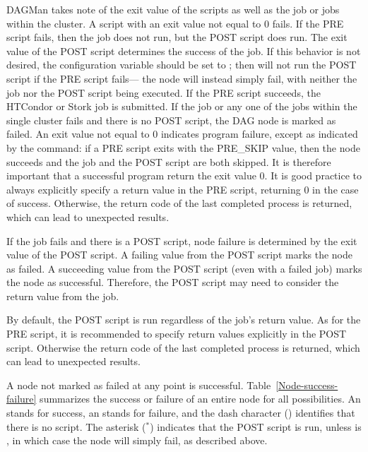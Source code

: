 \begin{itemize}
DAGMan takes note of the exit value of the scripts as well as the job or jobs
within the cluster.  
A script with an exit value not equal to 0 fails.  
If the PRE script fails, 
then the job does not run, but the POST script does run.
The exit value of the POST script determines the success of the job. 
If this behavior is not desired, 
the configuration variable  
should be set to ;
then  will not run the POST script if the PRE script fails---%
the node will instead simply fail, 
with neither the job nor the POST script being executed.
If the PRE script succeeds, the HTCondor or Stork job is submitted.
If the job or any one of the jobs within the single cluster fails and there is
no POST script, 
the DAG node is marked as failed.  
An exit value not equal to 0 indicates program failure,
except as indicated by the  command:
if a PRE script exits with the PRE\_SKIP value, 
then the node succeeds and the job and the POST script are both skipped.  
It is therefore important that a
successful program return the exit value 0. 
It is good practice to always
explicitly specify a return value in the PRE script,
returning 0 in the case of success.
Otherwise,
the return code of the last completed process is returned,
which can lead to unexpected results. 

If the job fails and there is a POST script,
node failure is determined by the exit value of the POST script.
A failing value from the POST script marks the node as failed.
A succeeding value from the POST script (even with a failed
job) marks the node as successful.
Therefore, the POST script may need to consider the return
value from the job.

By default, the POST script is run regardless of the job's
return value. As for the PRE script, it is recommended to 
specify return values explicitly in the POST script. 
Otherwise the return code of the last completed process 
is returned, which can lead to unexpected results. 

A node not marked as failed at any point is successful.
Table~\ref{Node-success-failure}
summarizes the success or failure of an entire node
for all possibilities.
An  stands for success,
an  stands for failure,
and the dash character (\Arg{-}) identifies that there is no script. The
asterisk (${}^\ast$) indicates that the POST script is run, unless
 is , in which case the node
will simply fail, as described above.


\end{itemize}
